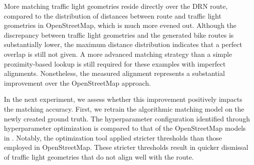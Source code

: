 More matching traffic light geometries reside directly over the DRN route, compared to the distribution of distances between route and traffic light geometries in OpenStreetMap, which is much more evened out. Although the discrepancy between traffic light geometries and the generated bike routes is substantially lower, the maximum distance distribution indicates that a perfect overlap is still not given. A more advanced matching strategy than a simple proximity-based lookup is still required for these examples with imperfect alignments. Nonetheless, the measured alignment represents a substantial improvement over the OpenStreetMap approach. 

\begin{table}[b]
\caption{Retrained model thresholds on the new routing.}
\label{tab:hyperparameter-tuning-results-drn}
\end{table}

In the next experiment, we assess whether this improvement positively impacts the matching accuracy. First, we retrain the algorithmic matching model on the newly created ground truth. The hyperparameter configuration identified through hyperparameter optimization is compared to that of the OpenStreetMap models in . Notably, the optimization tool applied stricter thresholds than those employed in OpenStreetMap. These stricter thresholds result in quicker dismissal of traffic light geometries that do not align well with the route.

